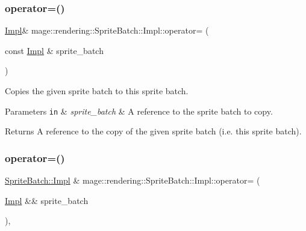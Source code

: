 \subsubsection{\texorpdfstring{operator=()}{operator=()}\hspace{0.1cm}{\footnotesize\ttfamily [1/2]}}
{\footnotesize\ttfamily \mbox{\hyperlink{classmage_1_1rendering_1_1_sprite_batch_1_1_impl}{Impl}}\& mage\+::rendering\+::\+Sprite\+Batch\+::\+Impl\+::operator= (\begin{DoxyParamCaption}\item[{const \mbox{\hyperlink{classmage_1_1rendering_1_1_sprite_batch_1_1_impl}{Impl}} \&}]{sprite\+\_\+batch }\end{DoxyParamCaption})\hspace{0.3cm}{\ttfamily [delete]}}

Copies the given sprite batch to this sprite batch.


\begin{DoxyParams}[1]{Parameters}
\mbox{\tt in}  & {\em sprite\+\_\+batch} & A reference to the sprite batch to copy. \\
\hline
\end{DoxyParams}
\begin{DoxyReturn}{Returns}
A reference to the copy of the given sprite batch (i.\+e. this sprite batch). 
\end{DoxyReturn}
\mbox{\label{classmage_1_1rendering_1_1_sprite_batch_1_1_impl_a46daa28e38d091e3d9050dca282b90aa}} 
\subsubsection{\texorpdfstring{operator=()}{operator=()}\hspace{0.1cm}{\footnotesize\ttfamily [2/2]}}
{\footnotesize\ttfamily \mbox{\hyperlink{classmage_1_1rendering_1_1_sprite_batch_1_1_impl}{Sprite\+Batch\+::\+Impl}} \& mage\+::rendering\+::\+Sprite\+Batch\+::\+Impl\+::operator= (\begin{DoxyParamCaption}\item[{\mbox{\hyperlink{classmage_1_1rendering_1_1_sprite_batch_1_1_impl}{Impl}} \&\&}]{sprite\+\_\+batch }\end{DoxyParamCaption})\hspace{0.3cm}{\ttfamily [default]}, {\ttfamily [noexcept]}}

